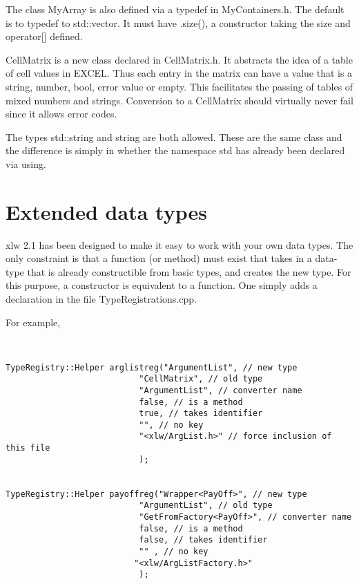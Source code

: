 \documentclass[12pt,reqno]{amsart}
\numberwithin{equation}{section}
\numberwithin{figure}{section}
\begin{document}
The class MyArray is also defined via a typedef in MyContainers.h. The
default is to typedef to std::vector. It must have .size(), a
constructor taking the size and operator[] defined. 

CellMatrix is a new class declared in CellMatrix.h. It abstracts the
idea of a table of cell values in EXCEL. Thus each entry in the matrix
can have a value that is a string, number, bool, error value or
empty. This facilitates the passing of tables of mixed numbers and
strings. Conversion to a CellMatrix should virtually never fail since
it allows error codes. 

The types std::string and string are both allowed. These are the same
class and the difference is simply in whether the namespace std has
already been declared via using. 

\section{Extended data types}

xlw 2.1 has been designed to make it easy to work with your own data
types. The only constraint is that a function (or method) must exist
that takes in a data-type that is already constructible from basic
types, and creates the new type. For this purpose, a constructor is
equivalent to a function. One simply adds a declaration in the file
TypeRegistrations.cpp. 

For example,
\begin{verbatim}


TypeRegistry::Helper arglistreg("ArgumentList", // new type
                           "CellMatrix", // old type
                           "ArgumentList", // converter name
                           false, // is a method
                           true, // takes identifier 
                           "", // no key
                           "<xlw/ArgList.h>" // force inclusion of this file
                           );


TypeRegistry::Helper payoffreg("Wrapper<PayOff>", // new type
                           "ArgumentList", // old type
                           "GetFromFactory<PayOff>", // converter name
                           false, // is a method
                           false, // takes identifier 
                           "" , // no key
                          "<xlw/ArgListFactory.h>"
                           );


\end{verbatim}
\end{document}
